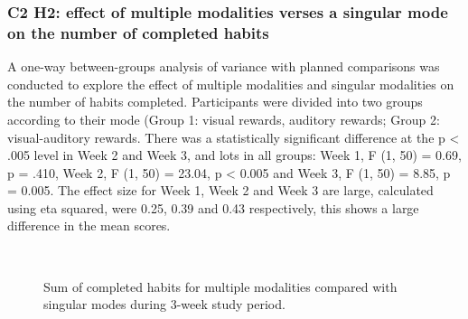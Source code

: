 \documentclass{scaffold/sigchi}
\begin{document}
\subsubsection{C2 H2: effect of multiple modalities verses a singular mode on the number of completed habits}

A one-way between-groups analysis of variance with planned comparisons was conducted to explore the effect of multiple modalities and singular modalities on the number of habits completed. Participants were divided into two groups according to their mode (Group 1: visual rewards, auditory rewards; Group 2: visual-auditory rewards. There was a statistically significant difference at the p < .005 level in Week 2 and Week 3, and lots in all groups: Week 1, F (1, 50) = 0.69, p = .410, Week 2, F (1, 50) = 23.04, p < 0.005 and Week 3, F (1, 50) = 8.85, p = 0.005. The effect size for Week 1, Week 2 and Week 3 are large, calculated using eta squared, were 0.25, 0.39 and 0.43 respectively, this shows a large difference in the mean scores.

\begin{figure}
  \centering
  \caption{Sum of completed habits for multiple modalities compared with singular modes during 3-week study period.}~\label{fig:c2_h2}
\end{figure}
\end{document}
